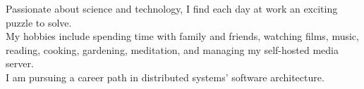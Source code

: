 %
%
%

\vspace{-0.8em}
\vspace{0.5em}
Passionate about science and technology, I find each day at work an exciting puzzle to solve.\\
My hobbies include spending time with family and friends, watching films, music, reading, cooking, gardening, meditation, and managing my self-hosted media server.\\
I am pursuing a career path in distributed systems' software architecture.
